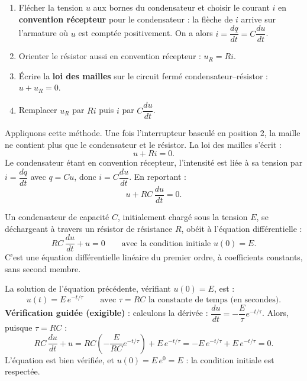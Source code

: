 \documentclass[11pt]{article}
\begin{document}
\begin{methode}
\begin{enumerate}
\item Flécher la tension $u$ aux bornes du condensateur et choisir le courant $i$ en \textbf{convention récepteur} pour le condensateur : la flèche de $i$ arrive sur l'armature où $u$ est comptée positivement. On a alors $i = \dfrac{dq}{dt} = C\dfrac{du}{dt}$.
\item Orienter le résistor aussi en convention récepteur : $u_R = Ri$.
\item Écrire la \textbf{loi des mailles} sur le circuit fermé condensateur--résistor : $u + u_R = 0$.
\item Remplacer $u_R$ par $Ri$ puis $i$ par $C\dfrac{du}{dt}$.
\end{enumerate}
\end{methode}

Appliquons cette méthode. Une fois l'interrupteur basculé en position 2, la maille ne contient plus que le condensateur et le résistor. La loi des mailles s'écrit :
\[ u + Ri = 0. \]
Le condensateur étant en convention récepteur, l'intensité est liée à sa tension par $i = \dfrac{dq}{dt}$ avec $q = Cu$, donc $i = C\dfrac{du}{dt}$. En reportant :
\[ u + RC\,\dfrac{du}{dt} = 0. \]

\begin{propriete}
Un condensateur de capacité $C$, initialement chargé sous la tension $E$, se déchargeant à travers un résistor de résistance $R$, obéit à l'équation différentielle :
\[ RC\,\dfrac{du}{dt} + u = 0 \qquad \text{avec la condition initiale } u(0) = E. \]
C'est une équation différentielle linéaire du premier ordre, à coefficients constants, sans second membre.
\end{propriete}

\begin{propriete}
La solution de l'équation précédente, vérifiant $u(0) = E$, est :
\[ u(t) = E\,e^{-t/\tau} \qquad \text{avec } \tau = RC \text{ la constante de temps (en secondes).} \]
\textbf{Vérification guidée (exigible)} : calculons la dérivée : $\dfrac{du}{dt} = -\dfrac{E}{\tau}e^{-t/\tau}$. Alors, puisque $\tau = RC$ :
\[ RC\,\dfrac{du}{dt} + u = RC\left(-\frac{E}{RC}e^{-t/\tau}\right) + E\,e^{-t/\tau} = -E\,e^{-t/\tau} + E\,e^{-t/\tau} = 0. \]
L'équation est bien vérifiée, et $u(0) = E\,e^{0} = E$ : la condition initiale est respectée.
\end{propriete}
\end{document}
